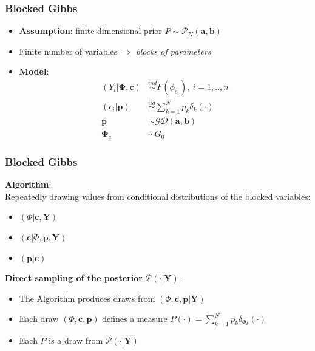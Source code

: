 \documentclass{beamer}
\begin{document}
\begin{frame} %
	\frametitle{Blocked Gibbs}
	\begin{itemize}
	    \item \textbf{Assumption}: finite dimensional prior  $P \sim  \mathscr{P}_{N}(\textbf{a},\textbf{b})$
	
        \item Finite number of variables $\Rightarrow$ \textit{blocks of parameters} \\
        \item \textbf{Model}:\\
        \begin{align*}
            (Y_{i}|\mathbf{\Phi},\mathbf{c})&\stackrel{ind}{\sim} F(\phi_{c_{i}}) , \ i=1,..,n \\
            (c_{i}|\mathbf{p})&\stackrel{iid}{\sim}\sum\limits_{k=1}^N \mathit{p_{k}}\delta_{k}(\cdot)\\
            \mathbf{p} &\sim \mathscr{GD}(\textbf{a},\textbf{b}) \\
            \mathbf{\Phi}_{c} & \sim G_{0}
        \end{align*}



	\end{itemize}
\end{frame}




\begin{frame} %
	\frametitle{Blocked Gibbs}
\textbf{Algorithm}: \\
Repeatedly drawing values from conditional distributions of the blocked variables:\\

\begin{itemize}
    \item $(\Phi | \textbf{c}, \textbf{Y})$
    \item $(\textbf{c}| \Phi,\textbf{p}, \textbf{Y})$
    \item $(\textbf{p}| \textbf{c})$

\end{itemize}

\textbf{Direct sampling of the posterior} $\mathscr{P}(\cdot|\mathbf{Y})$ :\\

\begin{itemize}
    \item The Algorithm produces draws from $(\Phi,\textbf{c},\textbf{p}| \textbf{Y})$ \\
\item Each draw $(\Phi,\textbf{c},\textbf{p})$ defines a measure $P(\cdot)= \sum\limits_{k=1}^N  \mathit{p_{k}}\delta_{\Phi_{k}}(\cdot) $
\item Each $P$ is a draw from $\mathscr{P}(\cdot|\mathbf{Y})$
\end{itemize}




\end{frame}
\end{document}
